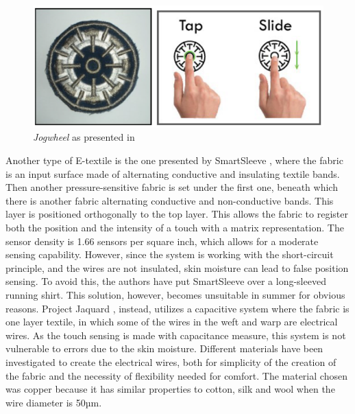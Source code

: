 \documentclass{sigchi}
\begin{document}
\begin{figure}
  \includegraphics[width=\columnwidth]{jogwheel.png}
  \caption{\emph{Jogwheel} as presented in \protect\cite{touch-wrist}}
  \label{fig:1}
\end{figure}
%
%
Another type of E-textile is the one presented by SmartSleeve \cite{smart-sleeve}, where the fabric is an input surface made of alternating conductive and insulating textile bands. Then another pressure-sensitive fabric is set under the first one, beneath which there is another fabric alternating conductive and non-conductive bands. This layer is positioned orthogonally to the top layer. This allows the fabric to register both the position and the intensity of a touch with a matrix representation. The sensor density is 1.66 sensors per square inch, which allows for a moderate sensing capability. However, since the system is working with the short-circuit principle, and the wires are not insulated, skin moisture can lead to false position sensing. To avoid this, the authors have put SmartSleeve over a long-sleeved running shirt. This solution, however, becomes unsuitable in summer for obvious reasons. %
%
Project Jaquard \cite{jacquard}, instead, utilizes a capacitive system where the fabric is one layer textile, in which some of the wires in the weft and warp are electrical wires. As the touch sensing is made with capacitance measure, this system is not vulnerable to errors due to the skin moisture. Different materials have been investigated to create the electrical wires, both for simplicity of the creation of the fabric and the necessity of flexibility needed for comfort. The material chosen was copper because it has similar properties to cotton, silk and wool when the wire diameter is 50µm.
%
\end{document}
